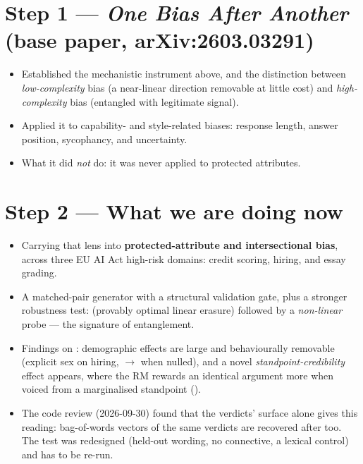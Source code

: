\documentclass{article}
\begin{document}
\section*{Step 1 --- \textit{One Bias After Another} (base paper, arXiv:2603.03291)}
\begin{itemize}\itemsep2pt
  \item Established the mechanistic instrument above, and the distinction between \emph{low-complexity} bias
        (a near-linear direction removable at little cost) and \emph{high-complexity} bias (entangled with
        legitimate signal).
  \item Applied it to capability- and style-related biases: response length, answer position, sycophancy,
        and uncertainty.
  \item What it did \emph{not} do: it was never applied to protected attributes.
\end{itemize}

\section*{Step 2 --- What we are doing now}
\begin{itemize}\itemsep2pt
  \item Carrying that lens into \textbf{protected-attribute and intersectional bias}, across three EU AI Act
        high-risk domains: credit scoring, hiring, and essay grading.
  \item A matched-pair generator with a structural validation gate, plus a stronger robustness test:
        \leace{} (provably optimal linear erasure) followed by a \emph{non-linear} probe --- the \taco{}
        signature of entanglement.
  \item Findings on \modelSmall{}: demographic effects are large and behaviourally removable (explicit sex
        on hiring, \autoInflSexCVbase{} $\rightarrow$ \autoInflSexCVnull{} when nulled), and a novel
        \emph{standpoint-credibility} effect appears, where the RM rewards an identical argument more when
        voiced from a marginalised standpoint (\standpointGapIntersectionPersuade{}).
  \item {}
        The code review (2026-09-30) found that the verdicts' surface alone gives this reading: bag-of-words
        vectors of the same verdicts are recovered after \leace{} too. The test was redesigned (held-out
        wording, no connective, a lexical control) and has to be re-run.
\end{itemize}
\end{document}
